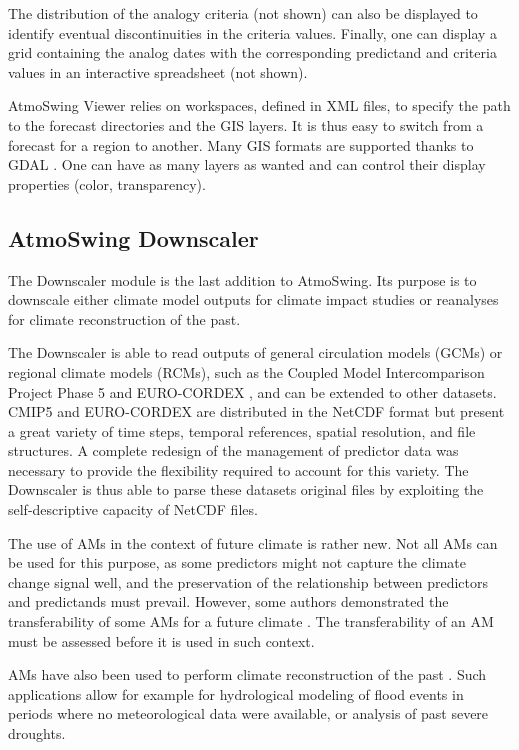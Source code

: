 \documentclass[review]{elsarticle}
\begin{document}
The distribution of the analogy criteria (not shown) can also be displayed to identify eventual discontinuities in the criteria values. Finally, one can display a grid containing the analog dates with the corresponding predictand and criteria values in an interactive spreadsheet (not shown). 

AtmoSwing Viewer relies on workspaces, defined in XML files, to specify the path to the forecast directories and the GIS layers. It is thus easy to switch from a forecast for a region to another. Many GIS formats are supported thanks to GDAL \cite[Geospatial Data Abstraction Library,][]{GDAL2014}. One can have as many layers as wanted and can control their display properties (color, transparency).


\subsection{AtmoSwing Downscaler}
\label{sec:downscaler}

The Downscaler module is the last addition to AtmoSwing. Its purpose is to downscale either climate model outputs for climate impact studies or reanalyses for climate reconstruction of the past. 

The Downscaler is able to read outputs of general circulation models (GCMs) or regional climate models (RCMs), such as the Coupled Model Intercomparison Project Phase 5 \citep[CMIP5,][]{Taylor2012} and EURO-CORDEX \citep{Jacob2014}, and can be extended to other datasets. CMIP5 and EURO-CORDEX are distributed in the NetCDF format but present a great variety of time steps, temporal references, spatial resolution, and file structures. A complete redesign of the management of predictor data was necessary to provide the flexibility required to account for this variety. The Downscaler is thus able to parse these datasets original files by exploiting the self-descriptive capacity of NetCDF files. 

The use of AMs in the context of future climate is rather new. Not all AMs can be used for this purpose, as some predictors might not capture the climate change signal well, and the preservation of the relationship between predictors and predictands must prevail. However, some authors demonstrated the transferability of some AMs for a future climate \citep{Dayon2015, Dayon2018, Raynaud2016, Turco2017}. The transferability of an AM must be assessed before it is used in such context. 

AMs have also been used to perform climate reconstruction of the past \citep{Caillouet2016, Caillouet2017, Bonnet2017}. Such applications allow for example for hydrological modeling of flood events in periods where no meteorological data were available, or analysis of past severe droughts. 
\end{document}
